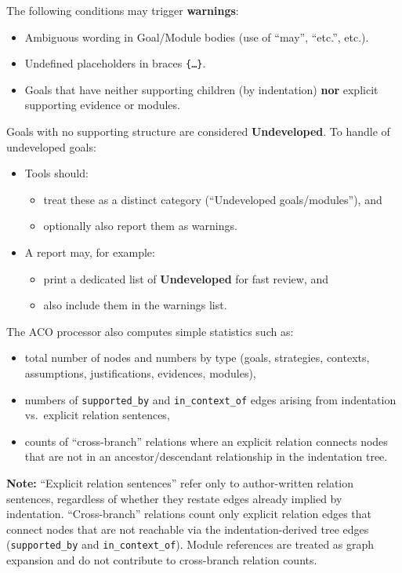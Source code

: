 \documentclass[11pt,twoside,a4paper]{article}
\begin{document}
The following conditions may trigger \textbf{warnings}:

\begin{itemize}[leftmargin=2em]
  \item Ambiguous wording in Goal/Module bodies (use of ``may'', ``etc.'', etc.).
  \item Undefined placeholders in braces \texttt{\{\dots\}}.
  \item Goals that have neither supporting children (by indentation) \textbf{nor} explicit supporting evidence or modules.
\end{itemize}

Goals with no supporting structure are considered \textbf{Undeveloped}.
To handle of undeveloped goals:

\begin{itemize}[leftmargin=2em]
  \item Tools should:
  \begin{itemize}[leftmargin=1.5em]
    \item treat these as a distinct category (``Undeveloped goals/modules''), and
    \item optionally also report them as warnings.
  \end{itemize}
  \item A report may, for example:
  \begin{itemize}[leftmargin=1.5em]
    \item print a dedicated list of \textbf{Undeveloped} for fast review, and
    \item also include them in the warnings list.
  \end{itemize}
\end{itemize}

The ACO processor also computes simple statistics such as:
\begin{itemize}[leftmargin=2em]
  \item total number of nodes and numbers by type (goals, strategies, contexts, assumptions, justifications, evidences, modules),
  \item numbers of \texttt{supported\_by} and \texttt{in\_context\_of} edges arising from indentation vs.\ explicit relation sentences,
  \item counts of ``cross-branch'' relations where an explicit relation connects nodes that are not in an ancestor/descendant relationship in the indentation tree.
\end{itemize}
%
\noindent\textbf{Note:} ``Explicit relation sentences'' refer only to author-written relation sentences, regardless of whether they restate edges already implied by indentation.
``Cross-branch'' relations count only explicit relation edges that connect nodes that are not reachable via the indentation-derived tree edges (\texttt{supported\_by} and \texttt{in\_context\_of}).
Module references are treated as graph expansion and do not contribute to cross-branch relation counts.
\end{document}
